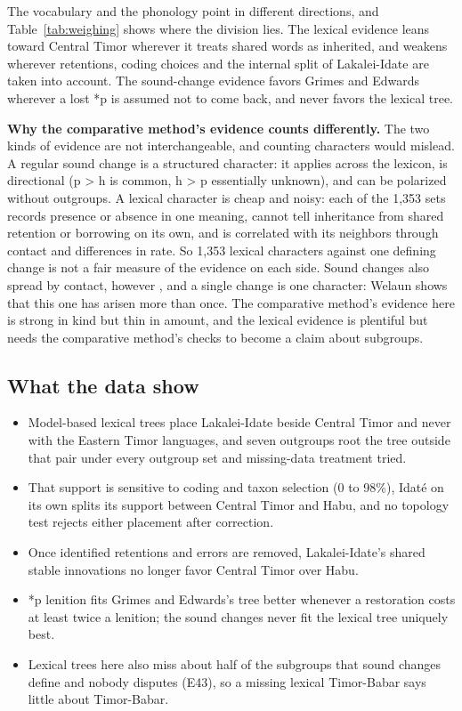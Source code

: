 \documentclass[11pt]{article}
\begin{document}
The vocabulary and the phonology point in different directions, and Table~\ref{tab:weighing} shows where the division lies. The lexical evidence leans toward Central Timor wherever it treats shared words as inherited, and weakens wherever retentions, coding choices and the internal split of Lakalei-Idate are taken into account. The sound-change evidence favors Grimes and Edwards wherever a lost *p is assumed not to come back, and never favors the lexical tree.

\textbf{Why the comparative method's evidence counts differently.} The two kinds of evidence are not interchangeable, and counting characters would mislead. A regular sound change is a structured character: it applies across the lexicon, is directional (p \textgreater{} h is common, h \textgreater{} p essentially unknown), and can be polarized without outgroups. A lexical character is cheap and noisy: each of the 1,353 sets records presence or absence in one meaning, cannot tell inheritance from shared retention or borrowing on its own, and is correlated with its neighbors through contact and differences in rate. So 1,353 lexical characters against one defining change is not a fair measure of the evidence on each side. Sound changes also spread by contact, however \citep{schapper2020}, and a single change is one character: Welaun shows that this one has arisen more than once. The comparative method's evidence here is strong in kind but thin in amount, and the lexical evidence is plentiful but needs the comparative method's checks to become a claim about subgroups.

\subsection{What the data show}

\begin{itemize}
\item Model-based lexical trees place Lakalei-Idate beside Central Timor and never with the Eastern Timor languages, and seven outgroups root the tree outside that pair under every outgroup set and missing-data treatment tried.
\item That support is sensitive to coding and taxon selection (0 to 98\%), Idaté on its own splits its support between Central Timor and Habu, and no topology test rejects either placement after correction.
\item Once identified retentions and errors are removed, Lakalei-Idate's shared stable innovations no longer favor Central Timor over Habu.
\item *p lenition fits Grimes and Edwards's tree better whenever a restoration costs at least twice a lenition; the sound changes never fit the lexical tree uniquely best.
\item Lexical trees here also miss about half of the subgroups that sound changes define and nobody disputes (E43), so a missing lexical Timor-Babar says little about Timor-Babar.
\end{itemize}
\end{document}
